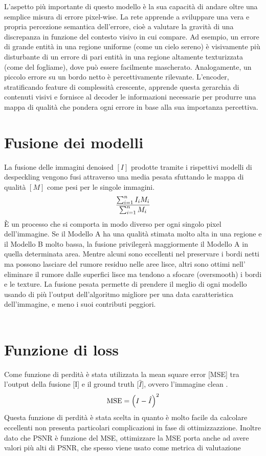 L’aspetto più importante di questo modello è la sua capacità di andare oltre una semplice misura di errore pixel-wise. 
La rete apprende a sviluppare una vera e propria percezione semantica dell’errore, cioè a valutare la gravità di una 
discrepanza in funzione del contesto visivo in cui compare. Ad esempio, un errore di grande entità in una regione 
uniforme (come un cielo sereno) è visivamente più disturbante di un errore di pari entità in una regione altamente 
texturizzata (come del fogliame), dove può essere facilmente mascherato. Analogamente, un piccolo errore su un bordo 
netto è percettivamente rilevante. L’encoder, stratificando feature di complessità crescente, apprende questa gerarchia 
di contenuti visivi e fornisce al decoder le informazioni necessarie per produrre una mappa di qualità che pondera 
ogni errore in base alla sua importanza percettiva.

\section{Fusione dei modelli}
La fusione delle immagini denoised $[I]$ prodotte tramite i rispettivi modelli di despeckling vengono fusi attraverso una media pesata sfuttando
le mappa di qualità $[M]$ come pesi per le singole immagini.
\begin{equation}
    \makebox[\textwidth][c]{%
      $\displaystyle
        \frac{\sum_{i=1}^{n} I_i M_i}{\sum_{i=1}^{n} M_i}
      $%
    }
\end{equation}
È un processo che si comporta in modo diverso per ogni singolo pixel dell'immagine. Se il Modello A ha una qualità stimata 
molto alta in una regione e il Modello B molto bassa, la fusione privilegerà maggiormente 
il Modello A in quella determinata area. Mentre alcuni sono eccellenti nel preservare i bordi netti ma possono lasciare del rumore residuo nelle aree lisce, 
altri sono ottimi nell' eliminare il rumore dalle superfici lisce ma tendono a sfocare (oversmooth) i bordi e le texture.
La fusione pesata permette di prendere il meglio di ogni modello usando di più l'output dell'algoritmo migliore per una data 
caratteristica dell'immagine, e meno i suoi contributi peggiori.
\\\\
\section{Funzione di loss}
Come funzione di perdità è stata utilizzata la mean square error [MSE] tra l'output della fusione [I] 
e il ground truth [$\hat{I}$], ovvero l'immagine clean . 
\begin{equation}
  \makebox[\textwidth][c]{%
    $\displaystyle
    \text{MSE} = \left( I - \hat{I} \right)^2
    $%
  }
\end{equation}
Questa funzione di perdità è stata scelta in quanto è molto facile da calcolare eccellenti 
non presenta particolari complicazioni in fase di ottimizzazzione. Inoltre 
dato che PSNR è funzione del MSE, ottimizzare la MSE porta anche ad avere valori 
più alti di PSNR, che spesso viene usato come metrica di valutazione 

